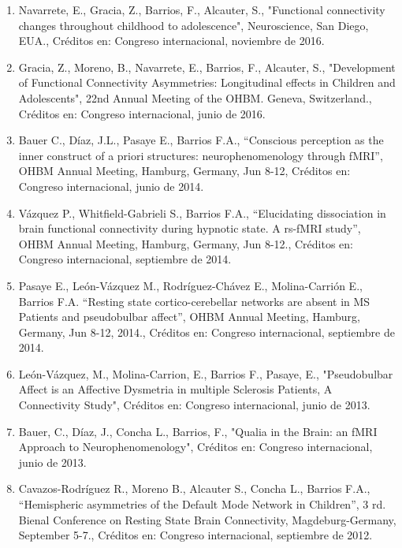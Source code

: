 \begin{enumerate}
\item Navarrete, E., Gracia, Z., Barrios, F., Alcauter, S., "Functional connectivity changes throughout childhood to 
adolescence", Neuroscience, San Diego, EUA., Créditos en: Congreso internacional, noviembre de 2016.

\item Gracia, Z., Moreno, B., Navarrete, E., Barrios, F., Alcauter, S., "Development of Functional Connectivity Asymmetries: 
Longitudinal effects in Children and Adolescents", 22nd Annual Meeting of the OHBM. Geneva, Switzerland., Créditos en: 
Congreso internacional, junio de 2016.

\item Bauer C., Díaz, J.L., Pasaye E., Barrios F.A., “Conscious perception as the inner construct of a priori structures: 
neurophenomenology through fMRI”, OHBM Annual Meeting, Hamburg, Germany, Jun 8-12, Créditos en: Congreso internacional, 
junio de 2014.

\item Vázquez P., Whitfield-Gabrieli S., Barrios F.A., “Elucidating dissociation in brain functional connectivity during 
hypnotic state. A rs-fMRI study”, OHBM Annual Meeting, Hamburg, Germany, Jun 8-12., Créditos en: Congreso internacional, 
septiembre de 2014.

\item Pasaye E., León-Vázquez M., Rodríguez-Chávez E., Molina-Carrión E., Barrios F.A. “Resting state cortico-cerebellar networks are absent in MS 
Patients and pseudobulbar affect”, OHBM Annual Meeting, 
Hamburg, Germany, Jun 8-12, 2014., Créditos en: Congreso internacional, septiembre de 2014.

\item León-Vázquez, M., Molina-Carrion, E., Barrios F., Pasaye, E., "Pseudobulbar Affect is an Affective Dysmetria in 
multiple Sclerosis Patients, A Connectivity Study", Créditos en: Congreso internacional, junio de 2013.

\item Bauer, C., Díaz, J., Concha L., Barrios, F., "Qualia in the Brain: an fMRI Approach to Neurophenomenology", Créditos 
en: Congreso internacional, junio de 2013.

\item Cavazos-Rodríguez R., Moreno B., Alcauter S., Concha L., Barrios F.A., “Hemispheric asymmetries of the Default Mode 
Network in Children”, 3 rd. Bienal Conference on Resting State Brain Connectivity, Magdeburg-Germany, September 5-7., 
Créditos en: Congreso internacional, septiembre de 2012.


\end{enumerate}
